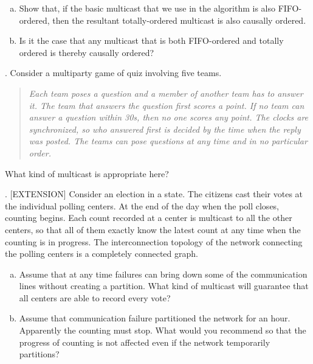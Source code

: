 \documentclass[12pt]{article}
\newcounter{question}
\newcommand{\question}[1]{
    \stepcounter{question}
    \thequestion. #1 \hfill
}
\begin{document}
\begin{enumerate}[(a)]
    \item Show that, if the basic multicast that we use in the algorithm is also FIFO-ordered, then the resultant totally-ordered multicast is also causally ordered.
    \item Is it the case that any multicast that is both FIFO-ordered and totally ordered is thereby causally ordered?
\end{enumerate}



\question{Consider a multiparty game of quiz involving five teams.}

\begin{quote}
    \textit{Each team poses a question and a member of another team has to answer it. The team that answers the question first scores a point. If no team can answer a question within 30s, then no one scores any point. The clocks are synchronized, so who answered first is decided by the time when the reply was posted. The teams can pose questions at any time and in no particular order.}
\end{quote}

What kind of multicast is appropriate here?

\question{[EXTENSION] Consider an election in a state. The citizens cast their votes at the individual polling centers. At the end of the day when the poll closes, counting begins. Each count recorded at a center is multicast to all the other centers, so that all of them exactly know the latest count at any time when the counting is in progress. The interconnection topology of the network connecting the polling centers is a completely connected graph.}

\begin{enumerate}[(a)]
    \item Assume that at any time failures can bring down some of the communication lines without creating a partition. What kind of multicast will guarantee that all centers are able to record every vote?
    \item Assume that communication failure partitioned the network for an hour. Apparently the counting must stop. What  would you recommend so that the progress of counting is not affected even if the network temporarily partitions?
\end{enumerate}
\end{document}
